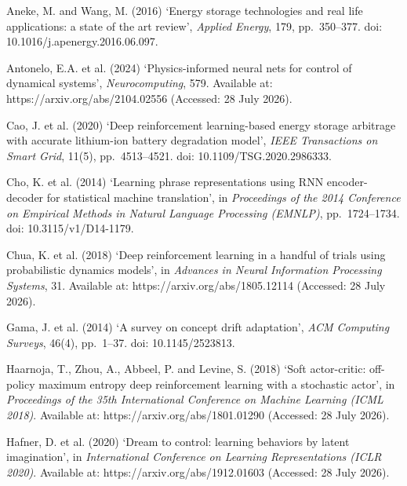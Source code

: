 \documentclass[conference]{IEEEtran}
\begin{document}
\begin{thebibliography}{}

Aneke, M. and Wang, M. (2016) `Energy storage technologies and real life applications: a state of the art review', \emph{Applied Energy}, 179, pp.\ 350--377. doi: 10.1016/j.apenergy.2016.06.097.

Antonelo, E.A. et al. (2024) `Physics-informed neural nets for control of dynamical systems', \emph{Neurocomputing}, 579. Available at: https://arxiv.org/abs/2104.02556 (Accessed: 28 July 2026).

Cao, J. et al. (2020) `Deep reinforcement learning-based energy storage arbitrage with accurate lithium-ion battery degradation model', \emph{IEEE Transactions on Smart Grid}, 11(5), pp.\ 4513--4521. doi: 10.1109/TSG.2020.2986333.

Cho, K. et al. (2014) `Learning phrase representations using RNN encoder-decoder for statistical machine translation', in \emph{Proceedings of the 2014 Conference on Empirical Methods in Natural Language Processing (EMNLP)}, pp.\ 1724--1734. doi: 10.3115/v1/D14-1179.

Chua, K. et al. (2018) `Deep reinforcement learning in a handful of trials using probabilistic dynamics models', in \emph{Advances in Neural Information Processing Systems}, 31. Available at: https://arxiv.org/abs/1805.12114 (Accessed: 28 July 2026).

Gama, J. et al. (2014) `A survey on concept drift adaptation', \emph{ACM Computing Surveys}, 46(4), pp.\ 1--37. doi: 10.1145/2523813.

Haarnoja, T., Zhou, A., Abbeel, P. and Levine, S. (2018) `Soft actor-critic: off-policy maximum entropy deep reinforcement learning with a stochastic actor', in \emph{Proceedings of the 35th International Conference on Machine Learning (ICML 2018)}. Available at: https://arxiv.org/abs/1801.01290 (Accessed: 28 July 2026).

Hafner, D. et al. (2020) `Dream to control: learning behaviors by latent imagination', in \emph{International Conference on Learning Representations (ICLR 2020)}. Available at: https://arxiv.org/abs/1912.01603 (Accessed: 28 July 2026).


\end{thebibliography}
\end{document}
